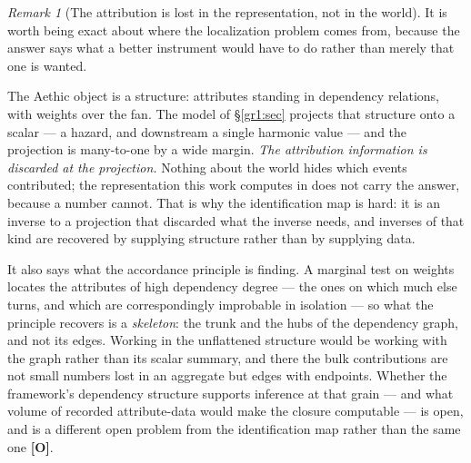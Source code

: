 \documentclass[11pt]{article}
\numberwithin{equation}{section}
\theoremstyle{plain}
\theoremstyle{definition}
\theoremstyle{remark}
\newtheorem{remark}[theorem]{Remark}
\begin{document}
\begin{remark}[The attribution is lost in the representation, not in the
world]\label{gc:rem:flattening}
It is worth being exact about where the localization problem comes from,
because the answer says what a better instrument would have to do rather
than merely that one is wanted.

The Aethic object is a structure: attributes standing in dependency
relations, with weights over the fan. The model of \S\ref{gr1:sec}
projects that structure onto a scalar --- a hazard, and downstream a
single harmonic value --- and the projection is many-to-one by a wide
margin. \emph{The attribution information is discarded at the
projection.} Nothing about the world hides which events contributed;
the representation this work computes in does not carry the answer,
because a number cannot. That is why the identification map is hard: it
is an inverse to a projection that discarded what the inverse needs, and
inverses of that kind are recovered by supplying structure rather than by
supplying data.

It also says what the accordance principle is finding. A marginal test on
weights locates the attributes of high dependency degree --- the ones on
which much else turns, and which are correspondingly improbable in
isolation --- so what the principle recovers is a \emph{skeleton}: the
trunk and the hubs of the dependency graph, and not its edges. Working in
the unflattened structure would be working with the graph rather than its
scalar summary, and there the bulk contributions are not small numbers
lost in an aggregate but edges with endpoints. Whether the framework's
dependency structure supports inference at that grain --- and what
volume of recorded attribute-data would make the closure computable --- is
open, and is a different open problem from the identification map rather
than the same one \textbf{[O]}.
\end{remark}
\end{document}
